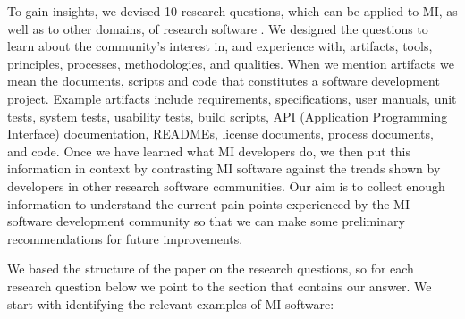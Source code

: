 \documentclass[final, 3p, times, authoryear]{elsarticle}
\begin{document}
To gain insights, we devised 10 research questions, which can be applied to MI,
as well as to other domains, of research software \citep{SmithEtAl2021,
SmithAndMichalski2022}.  We designed the questions to learn about the
community's interest in, and experience with, artifacts, tools, principles,
processes, methodologies, and qualities.  When we mention artifacts we mean the
documents, scripts and code that constitutes a software development project.
Example artifacts include requirements, specifications, user manuals, unit
tests, system tests, usability tests, build scripts, API (Application
Programming Interface) documentation, READMEs, license documents, process
documents, and code.  Once we have learned what MI developers do, we then put
this information in context by contrasting MI software against the trends shown
by developers in other research software communities.  Our aim is to collect
enough information to understand the current pain points experienced by the MI
software development community so that we can make some preliminary
recommendations for future improvements. 

We based the structure of the paper on the research questions, so for each
research question below we point to the section that contains our answer.  We
start with identifying the relevant examples of MI software:
\end{document}
